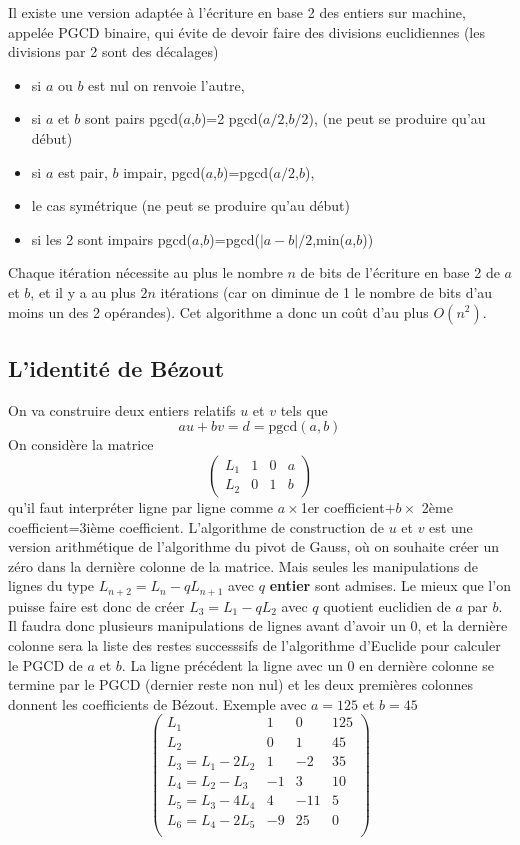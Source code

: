 \documentclass[a4paper,11pt]{book}
\begin{document}
\begin{giacjshere}
Il existe une version adapt\'ee \`a l'\'ecriture en base 2 des entiers
sur machine, appel\'ee PGCD binaire, qui \'evite de devoir faire
des divisions euclidiennes (les divisions par 2 sont des d\'ecalages)
\begin{itemize}
\item si $a$ ou $b$ est nul on renvoie l'autre, 
\item si $a$ et $b$ sont pairs
pgcd($a$,$b$)=2 pgcd($a/2$,$b/2$), (ne peut se produire qu'au d\'ebut)
\item si $a$ est pair, $b$ impair,
pgcd($a$,$b$)=pgcd($a/2$,$b$), 
\item le cas sym\'etrique (ne peut se produire qu'au d\'ebut)
\item si les 2 sont impairs
pgcd($a$,$b$)=pgcd($|a-b|/2$,min($a$,$b$))
\end{itemize}
Chaque it\'eration n\'ecessite au plus le nombre $n$ de bits de
l'\'ecriture en base 2 de $a$ et $b$, et il y a au plus $2n$
it\'erations (car on diminue de 1 le nombre de bits d'au moins un des 2
op\'erandes).
Cet algorithme a donc un co\^ut d'au plus $O(n^2)$.

\subsection{L'identit\'e de B\'ezout}
On va construire deux entiers relatifs $u$ et $v$ tels que
$$ au+bv=d = \mbox{pgcd}(a,b)$$
On consid\`ere la matrice
$$ \left(\begin{array}{rccc}
L_1 & 1 & 0 & a \\
L_2 & 0 & 1 & b 
\end{array}\right)
$$
qu'il faut interpr\'eter ligne par ligne comme $a\times$1er
coefficient$+b\times$ 2\`eme coefficient=3i\`eme coefficient.
L'algorithme de construction de $u$ et $v$ est une version arithm\'etique
de l'algorithme du pivot de Gauss, o\`u on souhaite cr\'eer un z\'ero dans la 
derni\`ere colonne de la matrice.
Mais seules les manipulations de lignes du type
$L_{n+2}=L_n-qL_{n+1}$ avec $q$ {\bf entier} sont admises.
Le mieux que l'on puisse faire est donc de cr\'eer $L_3=L_1-qL_2$
avec $q$ quotient euclidien de $a$ par $b$. Il faudra donc
plusieurs manipulations de lignes avant d'avoir un 0,
et la derni\`ere colonne sera la liste des restes successsifs
de l'algorithme d'Euclide pour calculer le PGCD de $a$ et $b$.
La ligne pr\'ec\'edent la ligne avec un 0 en derni\`ere colonne se
termine par le PGCD (dernier reste non nul) et les deux premi\`eres
colonnes donnent les coefficients de B\'ezout.
Exemple avec $a=125$ et $b=45$
$$
\left(\begin{array}{rccc}
L_1 & 1 & 0 & 125 \\
L_2 & 0 & 1 & 45 \\
L_3=L_1-2L_2 & 1 & -2 & 35\\
L_4=L_2-L_3 & -1 & 3 & 10 \\
L_5=L_3-4L_4 & 4 & -11 & 5 \\
L_6=L_4-2L_5 & -9 & 25 & 0 \\
\end{array}\right)
$$


\end{giacjshere}
\end{document}
